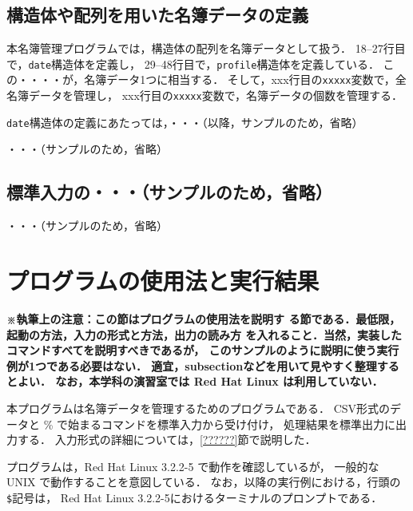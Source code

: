 \subsection{構造体や配列を用いた名簿データの定義}

本名簿管理プログラムでは，構造体の配列を名簿データとして扱う．
18--27行目で，\verb|date|構造体を定義し，
29--48行目で，\verb|profile|構造体を定義している．
この・・・・が，名簿データ1つに相当する．
そして，xxx行目の\verb|xxxxx|変数で，全名簿データを管理し，
xxx行目の\verb|xxxxx|変数で，名簿データの個数を管理する．

\verb|date|構造体の定義にあたっては，・・・（以降，サンプルのため，省略）

・・・（サンプルのため，省略）

\subsection{標準入力の・・・（\textbf{サンプルのため，省略}）}

・・・（サンプルのため，省略）


\section{プログラムの使用法と実行結果}
\textbf{\small ※執筆上の注意：この節はプログラムの使用法を説明す
    る節である．最低限，起動の方法，入力の形式と方法，出力の読み方
    を入れること．当然，実装したコマンドすべてを説明すべきであるが，
    このサンプルのように説明に使う実行例が1つである必要はない．
    適宜，subsectionなどを用いて見やすく整理するとよい．
    なお，本学科の演習室では Red Hat Linux は利用していない．\\}

本プログラムは名簿データを管理するためのプログラムである．
CSV形式のデータと \% で始まるコマンドを標準入力から受け付け，
処理結果を標準出力に出力する．
入力形式の詳細については，\ref{??????}節で説明した．

プログラムは，Red Hat Linux 3.2.2-5 で動作を確認しているが，
一般的な UNIX で動作することを意図している．
なお，以降の実行例における，行頭の\verb|$|記号は，
Red Hat Linux 3.2.2-5におけるターミナルのプロンプトである．

